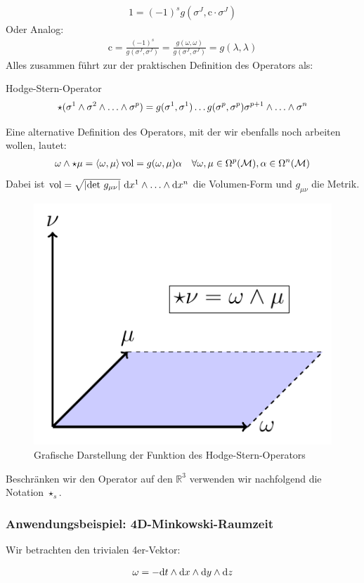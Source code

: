 \begin{align}
1 = (-1)^s g(\sigma^J,\text{c}\cdot\sigma^J)
\end{align}
Oder Analog:
\begin{align}
\text{c}= \frac{(-1)^s}{g(\sigma^J,\sigma^J)} = \frac{g(\omega,\omega)}{g(\sigma^J,\sigma^J)} = g(\lambda,\lambda)
\end{align}
Alles zusammen führt zur der praktischen Definition des Operators als:
\begin{mybox}{Hodge-Stern-Operator}
\begin{align}
\star(\sigma^1 \w \sigma^2 \w \dots \w \sigma^p) = g(\sigma^1,\sigma^1)\dots g(\sigma^p,\sigma^p) \sigma^{p+1}\w \dots \w \sigma^n
\end{align}
\end{mybox}

Eine alternative Definition des Operators, mit der wir ebenfalls noch arbeiten wollen, lautet:
\begin{align}
\omega \wedge \star \mu = \left<\omega,\mu \right>\text{vol} = g(\omega,\mu)\alpha \quad \forall \omega, \mu \in \Omega^p(\mathcal{M}), \alpha \in \Omega^n(\mathcal{M})
\end{align}
Dabei ist $\text{vol} = \sqrt{\abs{\text{det} \ g_{\mu\nu}}} \ \dd x^1 \w \dots \w \dd x^n$ die Volumen-Form und $g_{\mu\nu}$ die Metrik. \\
\begin{figure}[H]
	\centering
	\includegraphics[width=.3\linewidth]{figures/darstellung-hodge.pdf}
	\caption{Grafische Darstellung der Funktion des Hodge-Stern-Operators}
\end{figure}
Beschränken wir den Operator auf den $\mathbb{R}^3$ verwenden wir nachfolgend die Notation $\star_s$.
\subsubsection{Anwendungsbeispiel: 4D-Minkowski-Raumzeit}

Wir betrachten den trivialen 4er-Vektor:

\begin{align}
\omega = - \dd t \wedge \dd x\wedge \dd y \wedge \dd z
\end{align}

